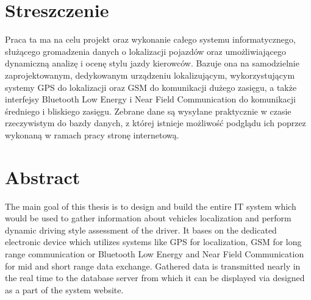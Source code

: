\chapter{Streszczenie}

Praca ta ma na celu projekt oraz wykonanie całego systemu informatycznego, służącego gromadzenia danych o lokalizacji pojazdów oraz umożliwiającego dynamiczną analizę i ocenę stylu jazdy kierowców. Bazuje ona na samodzielnie zaprojektowanym, dedykowanym urządzeniu lokalizującym, wykorzystującym systemy GPS do lokalizacji oraz GSM do komunikacji dużego zasięgu, a także interfejsy Bluetooth Low Energy i Near Field Communication do komunikacji średniego i bliskiego zasięgu. Zebrane dane są wysyłane praktycznie w czasie rzeczywistym do bazdy danych, z której istnieje możliwość podglądu ich poprzez wykonaną w ramach pracy stronę internetową.

\chapter{Abstract}

The main goal of this thesis is to design and build the entire IT system which would be used to gather information about vehicles localization and perform dynamic driving style assessment of the driver. It bases on the dedicated electronic device which utilizes systems like GPS for localization, GSM for long range communication or Bluetooth Low Energy and Near Field Communication for mid and short range data exchange. Gathered data is transmitted nearly in the real time to the database server from which it can be displayed via designed as a part of the system website.